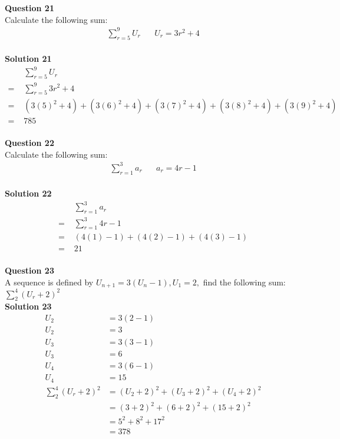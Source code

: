 \documentclass{article}
\begin{document}
\noindent\textbf{Question 21}\\[5pt]
Calculate the following sum:
\begin{align*}
\sum_{r=5}^{9} U_r \hspace{20pt}U_r=3r^2+4
\end{align*}\\[5pt]
\noindent\textbf{Solution 21}\\[5pt]
\begin{align*}
&\sum_{r=5}^{9} U_r\\[2pt]
=\,\,&\sum_{r=5}^{9} 3r^2+4\\[2pt]
=\,\,&(3(5)^2+4)+(3(6)^2+4)+(3(7)^2+4)+(3(8)^2+4)+(3(9)^2+4) \\[2pt]
=\,\,&785
\end{align*}\\[10pt]

\noindent\textbf{Question 22}\\[5pt]
Calculate the following sum:
\begin{align*}
\sum_{r=1}^{3} a_r \hspace{20pt}a_r=4r-1
\end{align*}\\[5pt]
\noindent\textbf{Solution 22}\\[5pt]
\begin{align*}
&\sum_{r=1}^{3} a_r\\[2pt]
=\,\,&\sum_{r=1}^{3} 4r-1\\[2pt]
=\,\,&(4(1)-1)+(4(2)-1)+(4(3)-1) \\[2pt]
=\,\,&21
\end{align*}\\[10pt]

\noindent\textbf{Question 23}\\[5pt]
A sequence is defined by $U_{n+1}=3(U_n -1), U_1=2,$ find the following sum: $\displaystyle\sum_{2}^{4} (U_r+2)^2$\\[5pt]
\noindent\textbf{Solution 23}\\[5pt]
\begin{align*}
U_2&=3(2-1)\\[2pt]
U_2&=3\\[12pt]
U_3&=3(3-1)\\[2pt]
U_3&=6\\[12pt]
U_4&=3(6-1)\\[2pt]
U_4&=15\\[12pt]
\displaystyle\sum_{2}^{4} (U_r+2)^2&=(U_2+2)^2+(U_3+2)^2+(U_4+2)^2\\[2pt]
&=(3+2)^2+(6+2)^2+(15+2)^2\\[2pt]
&=5^2+8^2+17^2\\[2pt]
&=378
\end{align*}\\[10pt]
\end{document}
